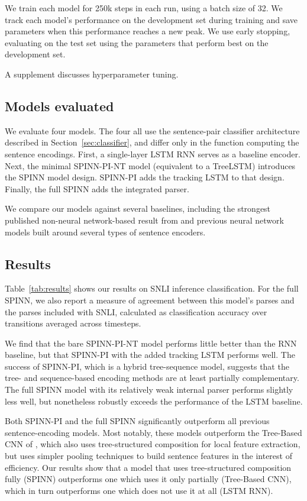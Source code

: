 \documentclass[11pt]{article}
\begin{document}
We train each model for 250k steps in each run, using a batch size of 32. We track each model's performance on the development set during training and save parameters when this performance reaches a new peak. We use early stopping, evaluating on the test set using the parameters that perform best on the development set.

A supplement discusses hyperparameter tuning.

\subsection{Models evaluated}

We evaluate four models. The four all use the sentence-pair classifier architecture described in Section~\ref{sec:classifier}, and differ only in the function computing the sentence encodings. First, a single-layer LSTM RNN \citep[similar to that of][]{snli:emnlp2015} serves as a baseline encoder. Next, the minimal SPINN-PI-NT model (equivalent to a TreeLSTM) introduces the SPINN model design. SPINN-PI adds the tracking LSTM to that design. Finally, the full SPINN adds the integrated parser.

We compare our models against several baselines, including the strongest published non-neural network-based result from \citet{snli:emnlp2015} and previous neural network models built around several types of sentence encoders.

\subsection{Results}

Table~\ref{tab:results} shows our results on SNLI inference classification. For the full SPINN, we also report a measure of agreement between this model's parses and the parses included with SNLI, calculated as classification accuracy over transitions averaged across timesteps.

We find that the bare SPINN-PI-NT model performs little better than the RNN baseline, but that SPINN-PI with the added tracking LSTM performs well. The success of SPINN-PI, which is a hybrid tree-sequence model, suggests that the tree- and sequence-based encoding methods are at least partially complementary. The full SPINN model with its relatively weak internal parser performs slightly less well, but nonetheless robustly exceeds the performance of the LSTM baseline.

Both SPINN-PI and the full SPINN significantly outperform all previous sentence-encoding models. Most notably, these models outperform the Tree-Based CNN of \citet{mou2015recognizing}, which also uses tree-structured composition for local feature extraction, but uses simpler pooling techniques to build sentence features in the interest of efficiency. Our results show that a model that uses tree-structured composition fully (SPINN) outperforms one which uses it only partially (Tree-Based CNN), which in turn outperforms one which does not use it at all (LSTM RNN).
\end{document}
